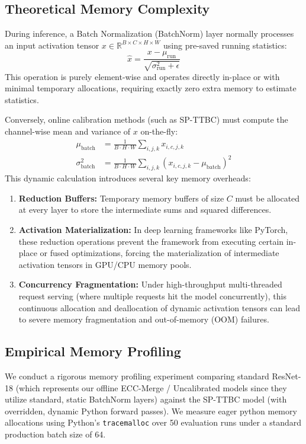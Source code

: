 \documentclass{article}
\theoremstyle{plain}
\theoremstyle{definition}
\theoremstyle{remark}
\begin{document}
\subsection{Theoretical Memory Complexity}
During inference, a Batch Normalization (BatchNorm) layer normally processes an input activation tensor $x \in \mathbb{R}^{B \times C \times H \times W}$ using pre-saved running statistics:
\begin{equation}
    \hat{x} = \frac{x - \mu_{\text{run}}}{\sqrt{\sigma^2_{\text{run}} + \epsilon}}
\end{equation}
This operation is purely element-wise and operates directly in-place or with minimal temporary allocations, requiring exactly zero extra memory to estimate statistics.

Conversely, online calibration methods (such as SP-TTBC) must compute the channel-wise mean and variance of $x$ on-the-fly:
\begin{align}
    \mu_{\text{batch}} &= \frac{1}{B \cdot H \cdot W} \sum_{i,j,k} x_{i,c,j,k} \\
    \sigma^2_{\text{batch}} &= \frac{1}{B \cdot H \cdot W} \sum_{i,j,k} (x_{i,c,j,k} - \mu_{\text{batch}})^2
\end{align}
This dynamic calculation introduces several key memory overheads:
\begin{enumerate}
    \item \textbf{Reduction Buffers:} Temporary memory buffers of size $C$ must be allocated at every layer to store the intermediate sums and squared differences.
    \item \textbf{Activation Materialization:} In deep learning frameworks like PyTorch, these reduction operations prevent the framework from executing certain in-place or fused optimizations, forcing the materialization of intermediate activation tensors in GPU/CPU memory pools.
    \item \textbf{Concurrency Fragmentation:} Under high-throughput multi-threaded request serving (where multiple requests hit the model concurrently), this continuous allocation and deallocation of dynamic activation tensors can lead to severe memory fragmentation and out-of-memory (OOM) failures.
\end{enumerate}

\subsection{Empirical Memory Profiling}
We conduct a rigorous memory profiling experiment comparing standard ResNet-18 (which represents our offline ECC-Merge / Uncalibrated models since they utilize standard, static BatchNorm layers) against the SP-TTBC model (with overridden, dynamic Python forward passes). We measure eager python memory allocations using Python's \texttt{tracemalloc} over 50 evaluation runs under a standard production batch size of 64.
\end{document}
